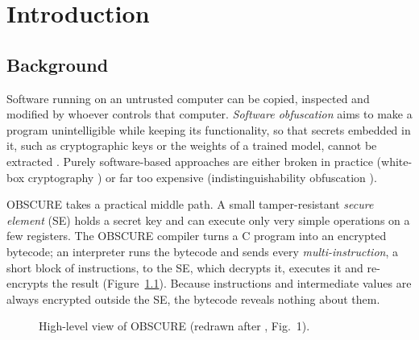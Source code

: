\documentclass[12pt,a4paper,oneside]{report}
\begin{document}
\clearpage
{}
\pagestyle{fancy}

\chapter{Introduction}

\section{Background}
Software running on an untrusted computer can be copied, inspected and modified by whoever
controls that computer. \emph{Software obfuscation} aims to make a program unintelligible while
keeping its functionality, so that secrets embedded in it, such as cryptographic keys or the
weights of a trained model, cannot be extracted \cite{obscure}. Purely software-based approaches
are either broken in practice (white-box cryptography \cite{chow, billet}) or far too expensive
(indistinguishability obfuscation \cite{bgi, jls}).

OBSCURE \cite{obscure, obscuregit} takes a practical middle path. A small tamper-resistant
\emph{secure element} (SE) holds a secret key and can execute only very simple operations on a
few registers. The OBSCURE compiler turns a C program into an encrypted bytecode; an interpreter
runs the bytecode and sends every \emph{multi-instruction}, a short block of instructions, to the
SE, which decrypts it, executes it and re-encrypts the result (Figure~\ref{fig:obscure-overview}).
Because instructions and intermediate values are always encrypted outside the SE, the bytecode
reveals nothing about them.

\begin{figure}[H]
\centering
{}
\caption{High-level view of OBSCURE (redrawn after \cite{obscure}, Fig.~1).}
\label{fig:obscure-overview}
\end{figure}
\end{document}
